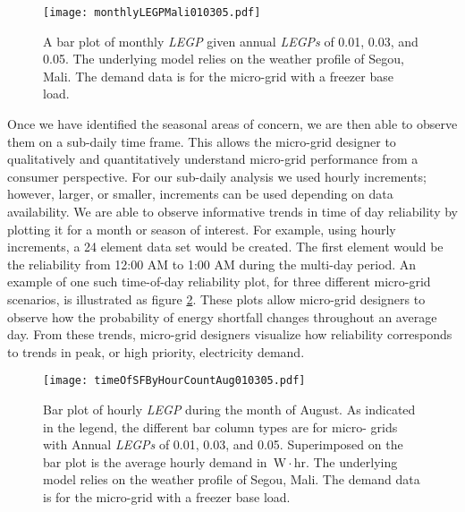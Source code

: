 \documentclass[11p]{article}
\newcommand{\unit}[1]{\ensuremath{\, \mathrm{#1}}}
\begin{document}


\begin{figure}[ht] 
  \centering
    \texttt{[image: monthlyLEGPMali010305.pdf]}
  \caption{A bar plot of monthly \emph{LEGP} given annual \emph{LEGPs} of 0.01, 0.03, and 0.05. 
  The underlying model relies on the weather profile of Segou, Mali.
  The demand data is for the micro-grid with a freezer base load. }
\label{MonthBar}
\end{figure}


Once we have identified the seasonal areas of concern, we are then able to observe them on a sub-daily time frame. 
This allows the micro-grid designer to qualitatively and quantitatively understand micro-grid performance from a consumer perspective. 
For our sub-daily analysis we used hourly increments; however, larger, or smaller, increments can be used depending on data availability.
%
%
We are able to observe informative trends in time of day reliability by plotting it for a month or season of interest. 
For example, using hourly increments, a 24 element data set would be created.
The first element would be the reliability from 12:00 AM to 1:00 AM during the multi-day period.
An example of one such time-of-day reliability plot, for three different micro-grid scenarios, is illustrated as figure \ref{HourBar}.
These plots allow micro-grid designers to observe how the probability of energy shortfall changes throughout an average day.
From these trends, micro-grid designers visualize how reliability corresponds to trends in peak, or high priority, electricity demand. 



\begin{figure}[ht] 
  \centering
    \texttt{[image: timeOfSFByHourCountAug010305.pdf]}
  \caption{Bar plot of hourly \emph{LEGP} during the month of August. 
  As indicated in the legend, the different bar column types are for micro-	
  grids with Annual \emph{LEGPs} of 0.01, 0.03, and 0.05.
  Superimposed on the bar plot is the average hourly demand in \unit{W\! \cdot \! hr}.
  The underlying model relies on the weather profile of Segou, Mali.
  The demand data is for the micro-grid with a freezer base load.}
\label{HourBar}
\end{figure}
\end{document}
